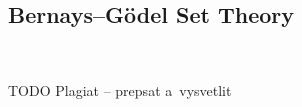 \documentclass[12pt,a4paper]{article}
\newtheorem{theorem}{Theorem}[section]
\newtheorem{definition}[theorem]{Definition}
\newenvironment{proof}
{\noindent \textit{Proof.}}
{\hspace*{\fill} $\Box$}
\begin{document}
\begin{}
{\begin{comment}
\

\end{comment}
}

{\color{red}
\begin{comment}


\begin{theorem}\label{th:refl_weakly_compact}
Let $\kappa$ be a~weakly compact cardinal. Then for every stationary set $S \subset \kappa$ there is an uncountable regular cardinal $\lambda < \kappa$ such that the set $S \cap \lambda$ is stationary in $\lambda$.
\end{theorem}
\begin{proof}
TODO
\end{proof}

\


\begin{definition}[Indescribability]
For Q either $\Pi^m_n$ or $\Sigma^m_n$\newline
A cardinal $\kappa$ is \emph{$Q-indescribable$} if whenever
$U \subseteq V_\kappa$ and $\varphi$ is a~Q sentence such that $\langle V_\kappa, \in, U \rangle \models \varphi$, then for some $\alpha < \kappa$, $\langle V_\alpha, \in, U \cap V_\alpha \rangle \models \varphi$.
\end{definition}

\end{comment}
}

\subsection{Bernays–G{\"o}del Set Theory}

\

TODO Plagiat -- prepsat a~vysvetlit

{\color{red}
\begin{comment}

G{\"o}del–Bernays set theory, also known as Von Neumann–Bernays–G{\"o}del set theory is an axiomatic set theory that 
explicitly talks about proper classes as well as sets, which allows it to be finitely axiomatizable, albeit our version stated below contains one schema. It is a~conservative extension of Zermalo–Fraenkel set theory. Using forcing, one can prove equiconsistency of BGC and ZFC.
\newline
 

\end{comment}}
\end{}
\end{document}
